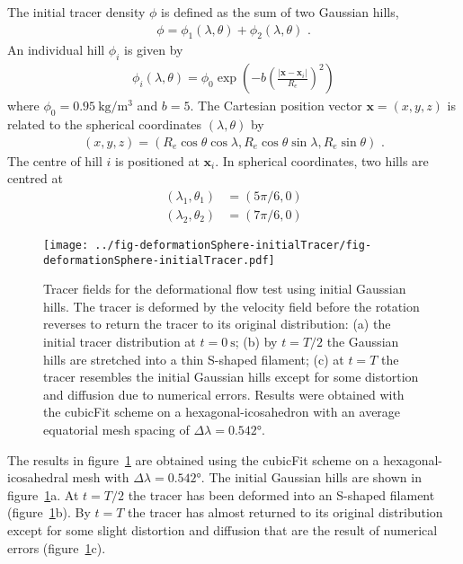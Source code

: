 The initial tracer density $\phi$ is defined as the sum of two Gaussian hills,
\begin{align}
	\phi = \phi_1(\lambda, \theta) + \phi_2(\lambda, \theta) \text{ .}
\end{align}
An individual hill $\phi_i$ is given by
\begin{align}
	\phi_i(\lambda, \theta) = \phi_0 \exp\left( -b \left( \frac{|\mathbf{x} - \mathbf{x}_i|}{R_e} \right)^2 \right)
\end{align}
where $\phi_0 = \SI{0.95}{\kilo\gram\per\meter\cubed}$ and $b = 5$.  The Cartesian position vector $\mathbf{x} = (x,y,z)$ is related to the spherical coordinates $(\lambda, \theta)$ by
\begin{align}
	(x,y,z) = (R_e \cos \theta \cos \lambda, R_e \cos \theta \sin \lambda, R_e \sin \theta) \label{eqn:spherical-cartesian} \text{ .}
\end{align}
The centre of hill $i$ is positioned at $\mathbf{x}_i$.  In spherical coordinates, two hills are centred at
\begin{align}
	(\lambda_1,\theta_1) &= (5 \pi /6, 0) \\
	(\lambda_2,\theta_2) &= (7 \pi /6, 0)
\end{align}

\begin{figure}
	\centering
	\texttt{[image: ../fig-deformationSphere-initialTracer/fig-deformationSphere-initialTracer.pdf]}
	\caption{Tracer fields for the deformational flow test using initial Gaussian hills.  The tracer is deformed by the velocity field before the rotation reverses to return the tracer to its original distribution: (a) the initial tracer distribution at $t = \SI{0}{\second}$; (b) by $t=T/2$ the Gaussian hills are stretched into a thin S-shaped filament; (c) at $t=T$ the tracer resembles the initial Gaussian hills except for some distortion and diffusion due to numerical errors.  Results were obtained with the cubicFit scheme on a hexagonal-icosahedron with an average equatorial mesh spacing of $\Delta \lambda = \ang{0.542}$.}
	\label{fig:deformationSphere-evolution}
\end{figure}

The results in figure~\ref{fig:deformationSphere-evolution} are obtained using the cubicFit scheme on a hexagonal-icosahedral mesh with $\Delta \lambda = \ang{0.542}$.  The initial Gaussian hills are shown in figure~\ref{fig:deformationSphere-evolution}a.  At $t=T/2$ the tracer has been deformed into an S-shaped filament (figure~\ref{fig:deformationSphere-evolution}b).  By $t=T$ the tracer has almost returned to its original distribution except for some slight distortion and diffusion that are the result of numerical errors (figure~\ref{fig:deformationSphere-evolution}c).

